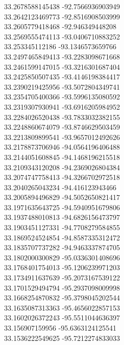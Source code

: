 {33.2678588145438	-92.7566936903949\\
33.2642123469773	-92.8516908503999\\
33.2605779418468	-92.946349448208\\
33.2569555474113	-93.0406710883252\\
33.253345112186	-93.1346573659766\\
33.2497465849413	-93.2283098671668\\
33.2461599147015	-93.3216301687404\\
33.2425850507435	-93.4146198384417\\
33.2390219425956	-93.5072804349741\\
33.2354705400366	-93.5996135080592\\
33.2319307930941	-93.6916205984952\\
33.2284026520438	-93.7833032382155\\
33.2248860674079	-93.8746629503459\\
33.2213809899541	-93.9657012492626\\
33.2178873706946	-94.0564196406488\\
33.2144051608845	-94.1468196215518\\
33.2109343120208	-94.2369026804384\\
33.2074747758413	-94.3266702972518\\
33.2040265043234	-94.416123943466\\
33.2005894496829	-94.5052650821417\\
33.1971635643725	-94.5940951679806\\
33.1937488010813	-94.6826156473797\\
33.1903451127331	-94.7708279584855\\
33.1869524524854	-94.8587335312472\\
33.1835707737282	-94.9463337874705\\
33.1802000300829	-95.0336301408696\\
33.1768401754013	-95.1206239971203\\
33.1734911637639	-95.2073167539122\\
33.1701529494794	-95.2937098009998\\
33.1668254870832	-95.3798045202544\\
33.1635087313363	-95.4656022857153\\
33.1602026372243	-95.5511044636397\\
33.156907159956	-95.6363124125541\\
33.1536222549625	-95.7212274833033\\
}
